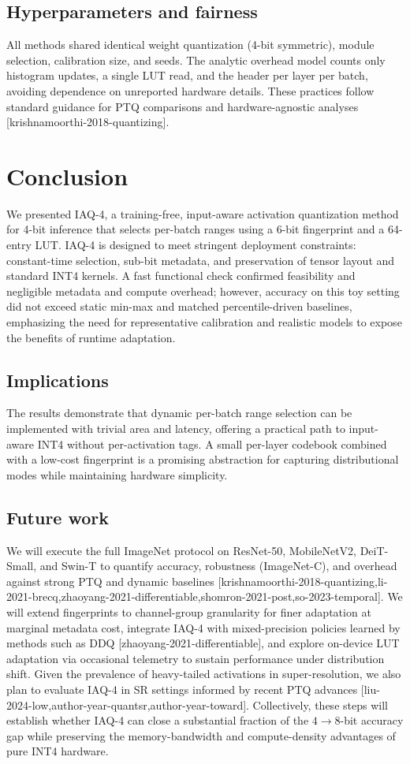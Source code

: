 \documentclass{article}
\begin{document}
\subsection{Hyperparameters and fairness}
All methods shared identical weight quantization (4-bit symmetric), module selection, calibration size, and seeds. The analytic overhead model counts only histogram updates, a single LUT read, and the header per layer per batch, avoiding dependence on unreported hardware details. These practices follow standard guidance for PTQ comparisons and hardware-agnostic analyses [krishnamoorthi-2018-quantizing].

\section{Conclusion}
We presented IAQ-4, a training-free, input-aware activation quantization method for 4-bit inference that selects per-batch ranges using a 6-bit fingerprint and a 64-entry LUT. IAQ-4 is designed to meet stringent deployment constraints: constant-time selection, sub-bit metadata, and preservation of tensor layout and standard INT4 kernels. A fast functional check confirmed feasibility and negligible metadata and compute overhead; however, accuracy on this toy setting did not exceed static min-max and matched percentile-driven baselines, emphasizing the need for representative calibration and realistic models to expose the benefits of runtime adaptation.

\subsection{Implications}
The results demonstrate that dynamic per-batch range selection can be implemented with trivial area and latency, offering a practical path to input-aware INT4 without per-activation tags. A small per-layer codebook combined with a low-cost fingerprint is a promising abstraction for capturing distributional modes while maintaining hardware simplicity.

\subsection{Future work}
We will execute the full ImageNet protocol on ResNet-50, MobileNetV2, DeiT-Small, and Swin-T to quantify accuracy, robustness (ImageNet-C), and overhead against strong PTQ and dynamic baselines [krishnamoorthi-2018-quantizing,li-2021-brecq,zhaoyang-2021-differentiable,shomron-2021-post,so-2023-temporal]. We will extend fingerprints to channel-group granularity for finer adaptation at marginal metadata cost, integrate IAQ-4 with mixed-precision policies learned by methods such as DDQ [zhaoyang-2021-differentiable], and explore on-device LUT adaptation via occasional telemetry to sustain performance under distribution shift. Given the prevalence of heavy-tailed activations in super-resolution, we also plan to evaluate IAQ-4 in SR settings informed by recent PTQ advances [liu-2024-low,author-year-quantsr,author-year-toward]. Collectively, these steps will establish whether IAQ-4 can close a substantial fraction of the \(4\to8\)-bit accuracy gap while preserving the memory-bandwidth and compute-density advantages of pure INT4 hardware.




\end{document}
